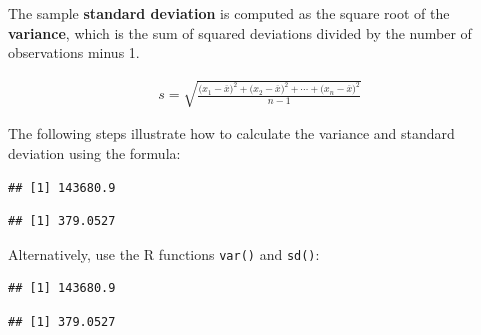 The sample \textbf{standard deviation} is computed as the square root of the \textbf{variance}, which is the sum of squared deviations divided by the number of observations minus 1. 

\begin{align*}
		s = \sqrt{\frac{({x_1 - \overline{x})}^{2}+({x_2 - \overline{x})}^{2}+\cdots+({x_n - \overline{x})}^{2}}{n-1}}
\end{align*}

The following steps illustrate how to calculate the variance and standard deviation using the formula: 

\begin{knitrout}
\color{fgcolor}\begin{kframe}
\begin{alltt}
 \hlkwb{=} \hlopt{$} \hlopt{-} 

 \hlkwb{=} \hlstd{(}\hlopt{^}\hlstd{))}\hlopt{/}\hlopt{-}\hlstd{)}
\end{alltt}
\begin{verbatim}
## [1] 143680.9
\end{verbatim}
\begin{alltt}
 \hlkwb{=} 
\end{alltt}
\begin{verbatim}
## [1] 379.0527
\end{verbatim}
\end{kframe}
\end{knitrout}

Alternatively, use the \textsf{R} functions \texttt{var()} and \texttt{sd()}:

\begin{knitrout}
\color{fgcolor}\begin{kframe}
\begin{alltt}
\hlopt{$}
\end{alltt}
\begin{verbatim}
## [1] 143680.9
\end{verbatim}
\begin{alltt}
\hlopt{$}
\end{alltt}
\begin{verbatim}
## [1] 379.0527
\end{verbatim}
\end{kframe}
\end{knitrout}


